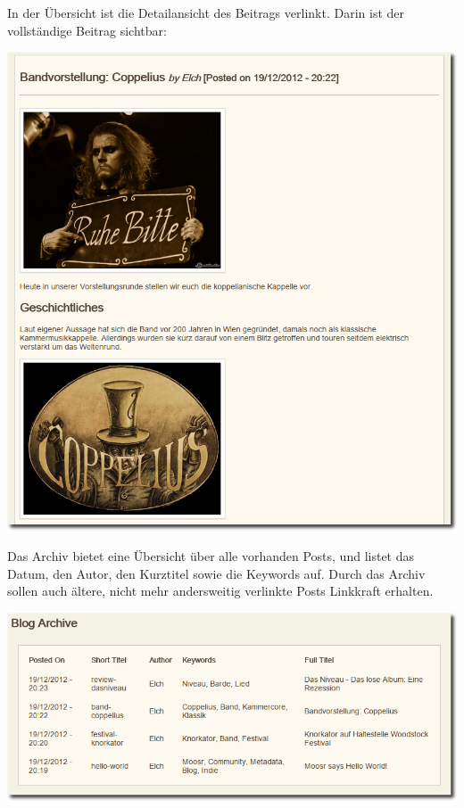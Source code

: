 In der Übersicht ist die Detailansicht des Beitrags verlinkt. Darin ist der
vollständige Beitrag sichtbar: 

\begin{center}
\includegraphics[width=\textwidth]{../screenshots/blog_detail.png}
\end{center}

Das Archiv bietet eine Übersicht über alle vorhanden Posts, und listet das
Datum, den Autor, den Kurztitel sowie die Keywords auf. Durch das Archiv sollen
auch ältere, nicht mehr andersweitig verlinkte Posts Linkkraft erhalten.

\begin{center}
\includegraphics[width=\textwidth]{../screenshots/blog_archive.png}
\end{center}

